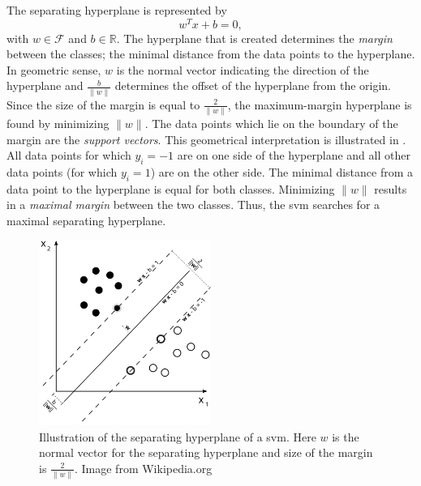 The separating hyperplane is represented by
\begin{equation}
w^T x + b = 0,
\end{equation}
with $w \in \mathcal{F}$ and $b \in \mathbb{R}$.
The hyperplane that is created determines the \emph{margin} between the classes; the minimal distance from the data points to the hyperplane.
In geometric sense, $w$ is the normal vector indicating the direction of the hyperplane and $\frac{b}{\lVert{w}\rVert}$ determines the offset of the hyperplane from the origin.
Since the size of the margin is equal to $\frac{2}{\lVert{w}\rVert}$, the maximum-margin hyperplane is found by minimizing $\lVert{w}\rVert$.
The data points which lie on the boundary of the margin are the \emph{support vectors}.
This geometrical interpretation is illustrated in .
All data points for which $y_i = -1$ are on one side of the hyperplane and all other data points (for which $y_i = 1$) are on the other side.
The minimal distance from a data point to the hyperplane is equal for both classes.
Minimizing $\lVert{w}\rVert$ results in a \emph{maximal margin} between the two classes.
Thus, the \gls{svm} searches for a maximal separating hyperplane.

\begin{figure}
\centering
  \includegraphics[width=0.5\textwidth]{./Figures/chapter3/svm_separating_plane_with_margin.png}
  \caption[\gls{svm} and the separating hyperplane]{Illustration of the separating hyperplane of a \gls{svm}.
  Here $w$ is the normal vector for the separating hyperplane and size of the margin is $\frac{2}{\lVert{w}\rVert}$.
  Image from Wikipedia.org}
  \label{fig:svm_hyperplane}
\end{figure}

